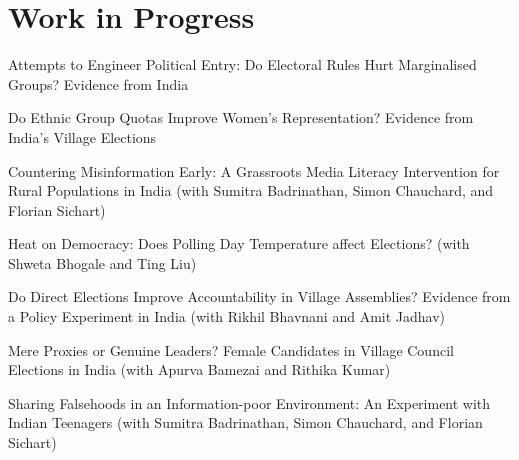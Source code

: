 \documentclass[10pt,letterpaper]{article}
\renewenvironment{itemize}{
  \begin{list}{}{
      \setlength{\leftmargin}{1.5em}
      \setlength{\itemsep}{0.25em}
      \setlength{\parskip}{0pt}
      \setlength{\parsep}{0.25em}
    }
}{
  \end{list}
}
\begin{document}
 \section*{Work in Progress}
 \begin{itemize}
 \item Attempts to Engineer Political Entry: Do Electoral Rules Hurt Marginalised Groups? Evidence from India
 \item Do Ethnic Group Quotas Improve Women’s Representation? Evidence from India’s Village Elections

\item Countering Misinformation Early: A Grassroots Media Literacy Intervention for Rural Populations in India (with Sumitra Badrinathan, Simon Chauchard, and Florian Sichart)
\item Heat on Democracy: Does Polling Day Temperature affect Elections?  (with Shweta Bhogale and Ting Liu)
 \item  Do Direct Elections Improve Accountability in Village Assemblies? Evidence from a Policy Experiment in India (with Rikhil Bhavnani and Amit Jadhav)
\item Mere Proxies or Genuine Leaders? Female Candidates in Village Council Elections in India (with Apurva Bamezai and Rithika Kumar)
\item Sharing Falsehoods in an Information-poor Environment: An Experiment with Indian Teenagers (with Sumitra Badrinathan, Simon Chauchard, and Florian Sichart)


\end{itemize}
\end{document}

